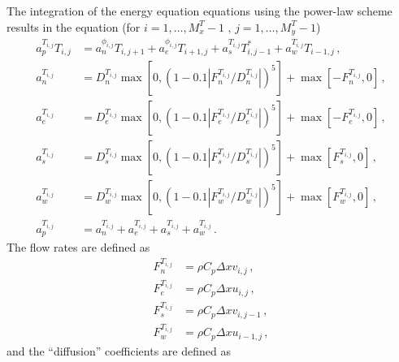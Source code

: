 \documentclass{article}
\begin{document}
The integration of the energy equation equations using the power-law scheme results in the equation (for $i = 1, \ldots, M_x^T - 1\,\,,\, j = 1, \ldots, M_y^T - 1$)
\begin{subequations}
	\label{eq:power}
	\begin{align}
	a^{T_{i,j}}_p T_{i,j} & = a^{\phi_{i,j}}_n T_{i, j+1} + a^{\phi_{i,j}}_e T_{i+1, j} + a^{T_{i,j}}_s T^*_{i, j-1} + a^{T_{i,j}}_w T_{i-1, j} \,,\\
	a^{T_{i,j}}_n & = D^{T_{i,j}}_n \max \left[0, (1 - 0.1 |F^{T_{i,j}}_n/D^{T_{i,j}}_n|)^5\right] + \max \left[ -F^{T_{i,j}}_n, 0 \right]\,, \\
	a^{T_{i,j}}_e & = D^{T_{i,j}}_e \max \left[0, (1 - 0.1 |F^{T_{i,j}}_e/D^{T_{i,j}}_e|)^5\right] + \max \left[ -F^{T_{i,j}}_e, 0 \right]\,, \\
	a^{T_{i,j}}_s & = D^{T_{i,j}}_s \max \left[0, (1 - 0.1 |F^{T_{i,j}}_s/D^{T_{i,j}}_s|)^5\right] + \max \left[ F^{T_{i,j}}_s, 0 \right]\,, \\
	a^{T_{i,j}}_w & = D^{T_{i,j}}_w \max \left[0, (1 - 0.1 |F^{T_{i,j}}_w/D^{T_{i,j}}_w|)^5\right] + \max \left[ F^{T_{i,j}}_w, 0 \right]\,, \\
	a^{T_{i,j}}_p & = a^{T_{i,j}}_n + a^{T_{i,j}}_e + a^{T_{i,j}}_s + a^{T_{i,j}}_w\,.
	\end{align}
\end{subequations}
The flow rates are defined as
\begin{subequations}
	\begin{align}
		F^{T_{i,j}}_n & = \rho C_p \Delta x v_{i,j}\,,\\
		F^{T_{i,j}}_e & = \rho C_p \Delta x u_{i,j}\,,\\
		F^{T_{i,j}}_s & = \rho C_p \Delta x v_{i,j - 1}\,,\\
		F^{T_{i,j}}_w & = \rho C_p \Delta x u_{i - 1,j}\,,
	\end{align}
\end{subequations}
and the ``diffusion'' coefficients are defined as
\end{document}
